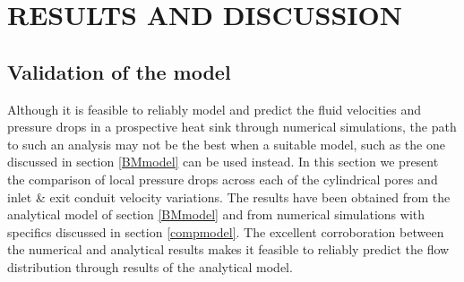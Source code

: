 \documentclass[twocolumn,10pt,cleanfoot]{ihmtc}
\begin{document}
\section{RESULTS AND DISCUSSION}
%
\subsection{Validation of the model}
Although it is feasible to reliably model and predict the fluid velocities and pressure drops in a prospective heat sink through numerical simulations, the path to such an analysis may not be the best when a suitable model, such as the one discussed in section \ref{BMmodel} can be used instead. In this section we present the comparison of local pressure drops across each of the cylindrical pores and inlet \& exit conduit velocity variations. The results have been obtained from the analytical model of section \ref{BMmodel} and from numerical simulations with specifics discussed in section \ref{compmodel}. The excellent corroboration between the numerical and analytical results makes it feasible to reliably predict the flow distribution through results of the analytical model. 
%
\end{document}
